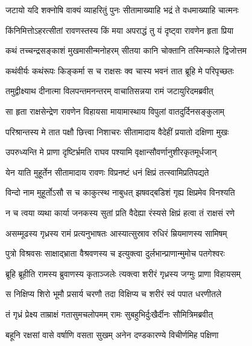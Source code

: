 \twolineshloka
{जटायो यदि शक्नोषि वाक्यं व्याहरितुं पुनः}
{सीतामाख्याहि भद्रं ते वधमाख्याहि चात्मनः} %

\twolineshloka
{किंनिमित्तोऽहरत्सीतां रावणस्तस्य किं मया}
{अपराद्धं तु यं दृष्ट्वा रावणेन हृता प्रिया} %

\twolineshloka
{कथं तच्चन्द्रसङ्काशं मुखमासीन्मनोहरम्}
{सीतया कानि चोक्तानि तस्मिन्काले द्विजोत्तम} %

\twolineshloka
{कथंवीर्यः कथंरूपः किङ्कर्मा स च राक्षसः}
{क्व चास्य भवनं तात ब्रूहि मे परिपृच्छतः} %

\twolineshloka
{तमुद्वीक्ष्याथ दीनात्मा विलपन्तमनन्तरम्}
{वाचातिसन्नया रामं जटायुरिदमब्रवीत्} %

\twolineshloka
{सा हृता राक्षसेन्द्रेण रावणेन विहायसा}
{मायामास्थाय विपुलां वातदुर्दिनसङ्कुलाम्} %

\twolineshloka
{परिश्रान्तस्य मे तात पक्षौ छित्त्वा निशाचरः}
{सीतामादाय वैदेहीं प्रयातो दक्षिणा मुखः} %

\twolineshloka
{उपरुध्यन्ति मे प्राणा दृष्टिर्भ्रमति राघव}
{पश्यामि वृक्षान्सौवर्णानुशीरकृतमूर्धजान्} %

\twolineshloka
{येन याति मुहूर्तेन सीतामादाय रावणः}
{विप्रनष्टं धनं क्षिप्रं तत्स्वामिप्रतिपद्यते} %

\twolineshloka
{विन्दो नाम मुहूर्तोऽसौ स च काकुत्स्थ नाबुधत्}
{झषवद्बडिशं गृह्य क्षिप्रमेव विनश्यति} %

\twolineshloka
{न च त्वया व्यथा कार्या जनकस्य सुतां प्रति}
{वैदेह्या रंस्यसे क्षिप्रं हत्वा तं राक्षसं रणे} %

\twolineshloka
{असम्मूढस्य गृध्रस्य रामं प्रत्यनुभाषतः}
{आस्यात्सुस्राव रुधिरं म्रियमाणस्य सामिषम्} %

\twolineshloka
{पुत्रो विश्रवसः साक्षाद्भ्राता वैश्रवणस्य च}
{इत्युक्त्वा दुर्लभान्प्राणान्मुमोच पतगेश्वरः} %

\twolineshloka
{ब्रूहि ब्रूहीति रामस्य ब्रुवाणस्य कृताञ्जलेः}
{त्यक्त्वा शरीरं गृध्रस्य जग्मुः प्राणा विहायसम्} %

\twolineshloka
{स निक्षिप्य शिरो भूमौ प्रसार्य चरणौ तदा}
{विक्षिप्य च शरीरं स्वं पपात धरणीतले} %

\twolineshloka
{तं गृध्रं प्रेक्ष्य ताम्राक्षं गतासुमचलोपमम्}
{रामः सुबहुभिर्दुःखैर्दीनः सौमित्रिमब्रवीत्} %

\twolineshloka
{बहूनि रक्षसां वासे वर्षाणि वसता सुखम्}
{अनेन दण्डकारण्ये विचीर्णमिह पक्षिणा} %

